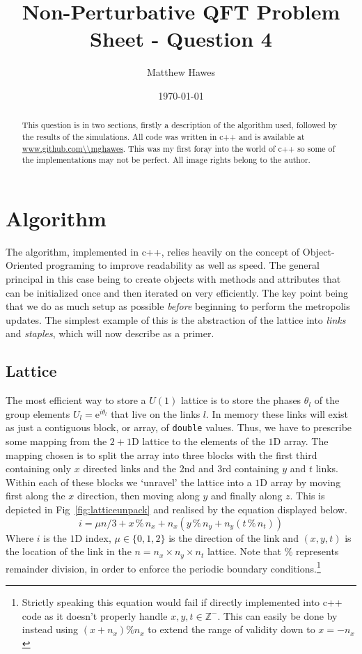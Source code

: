 \documentclass[12pt]{article}
\title{Non-Perturbative QFT Problem Sheet - Question 4}
\author{Matthew Hawes}
\date{\today}
\begin{document}
\maketitle

\begin{abstract}
This question is in two sections, firstly a description of the algorithm used, followed by the results of the simulations. All code was written in c++ and is available at \url{www.github.com\\mghawes}. This was my first foray into the world of c++ so some of the implementations may not be perfect. All image rights belong to the author.
\end{abstract}

\section{Algorithm}
The algorithm, implemented in c++, relies heavily on the concept of Object-Oriented programing to improve readability as well as speed. The general principal in this case being to create objects with methods and attributes that can be initialized once and then iterated on very efficiently. The key point being that we do as much setup as possible \emph{before} beginning to perform the metropolis updates. The simplest example of this is the abstraction of the lattice into \emph{links} and \emph{staples}, which will now describe as a primer.

\subsection{Lattice}
\label{sec:lattice}
The most efficient way to store a $U(1)$ lattice is to store the phases $\theta_l$ of the group elements $U_l = \mathrm{e}^{i\theta_l}$ that live on the links $l$. In memory these links will exist as just a contiguous block, or array, of \texttt{double} values. Thus, we have to prescribe some mapping from the $2+1\mathrm{D}$ lattice to the elements of the $1\mathrm{D}$ array. The mapping chosen is to split the array into three blocks with the first third containing only $x$ directed links and the 2nd and 3rd containing $y$ and $t$ links. Within each of these blocks we `unravel' the lattice into a $1\mathrm{D}$ array by moving first along the $x$ direction, then moving along $y$ and finally along $z$. This is depicted in Fig~\ref{fig:latticeunpack} and realised by the equation displayed below.
\begin{equation}
    i = \mu n/3  +  x \, \% \, n_x + n_x \left(  y \, \% \, n_y + n_y \left( t \, \% \, n_t \right) \right)
\end{equation}
Where $i$ is the $1\mathrm{D}$ index, $\mu \in \{0,1,2\}$ is the direction of the link and $(x,y,t)$ is the location of the link in the $n=n_x\times n_y \times n_t$ lattice. Note that $\%$ represents remainder division, in order to enforce the periodic boundary conditions.\footnote{Strictly speaking this equation would fail if directly implemented into c++ code as it doesn't properly handle $x,y,t \in \mathbb{Z}^-$. This can easily be done by instead using $ (x+n_x) \% n_x$ to extend the range of validity down to $x=-n_x$}
\end{document}
